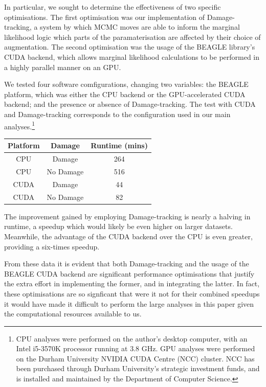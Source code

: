 \documentclass[10pt,journal,compsoc]{IEEEtran}
\begin{document}
In particular, we sought to determine the effectiveness of two specific optimisations. The first optimisation was our implementation of Damage-tracking, a system by which MCMC moves are able to inform the marginal likelihood logic which parts of the paramaterisation are affected by their choice of augmentation. The second optimisation was the usage of the BEAGLE library's CUDA backend, which allows marginal likelihood calculations to be performed in a highly parallel manner on an GPU.

We tested four software comfigurations, changing two variables: the BEAGLE platform, which was either the CPU backend or the GPU-accelerated CUDA backend; and the presence or absence of Damage-tracking. The test with CUDA and Damage-tracking corresponds to the configuration used in our main analyses.\footnote{CPU analyses were performed on the author's desktop computer, with an Intel i5-3570K processor running at 3.8 GHz. GPU analyses were performed on the Durham University NVIDIA CUDA Centre (NCC) cluster. NCC has been purchased through Durham University's strategic investment funds, and is installed and maintained by the Department of Computer Science.}

\begin{center}

\begin{tabular}{ |c|c|c| }
    \hline
    Platform & Damage & Runtime (mins) \\
    \hline
    CPU& Damage & 264 \\
    CPU& No Damage & 516 \\
    CUDA& Damage & 44 \\
    CUDA& No Damage & 82 \\
    \hline
\end{tabular}

\end{center}

The improvement gained by employing Damage-tracking is nearly a halving in runtime, a speedup which would likely be even higher on larger datasets. Meanwhile, the advantage of the CUDA backend over the CPU is even greater, providing a six-times speedup.

From these data it is evident that both Damage-tracking and the usage of the BEAGLE CUDA backend are significant performance optimisations that justify the extra effort in implementing the former, and in integrating the latter. In fact, these optimisations are so signficant that were it not for their combined speedups it would have made it difficult to perform the large analyses in this paper given the computational resources available to us.
\end{document}
